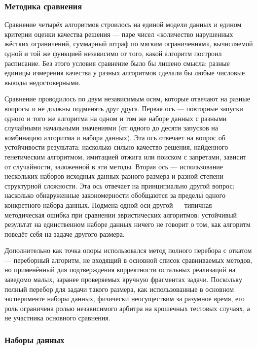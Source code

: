  
\subsubsection { Методика сравнения}

Сравнение четырёх алгоритмов строилось на единой модели данных и едином критерии оценки качества решения — паре чисел «количество нарушенных жёстких ограничений, суммарный штраф по мягким ограничениям», вычисляемой одной и той же функцией независимо от того, какой алгоритм построил расписание. Без этого условия сравнение было бы лишено смысла: разные единицы измерения качества у разных алгоритмов сделали бы любые числовые выводы недостоверными.

Сравнение проводилось по двум независимым осям, которые отвечают на разные вопросы и не должны подменять друг друга. Первая ось — повторные запуски одного и того же алгоритма на одном и том же наборе данных с разными случайными начальными значениями (от одного до десяти запусков на комбинацию алгоритма и набора данных). Эта ось отвечает на вопрос об устойчивости результата: насколько сильно качество решения, найденного генетическим алгоритмом, имитацией отжига или поиском с запретами, зависит от случайности, заложенной в эти методы. Вторая ось — использование нескольких наборов исходных данных разного размера и разной степени структурной сложности. Эта ось отвечает на принципиально другой вопрос: насколько обнаруженные закономерности обобщаются за пределы одного конкретного набора данных. Подмена одной оси другой — типичная методическая ошибка при сравнении эвристических алгоритмов: устойчивый результат на единственном наборе данных ничего не говорит о том, как алгоритм поведёт себя на задаче другого размера.

Дополнительно как точка опоры использовался метод полного перебора с откатом — переборный алгоритм, не входящий в основной список сравниваемых методов, но применённый для подтверждения корректности остальных реализаций на заведомо малых, заранее проверяемых вручную фрагментах задачи. Поскольку полный перебор для задачи такого размера, как использованные в основном эксперименте наборы данных, физически неосуществим за разумное время, его роль ограничена ролью независимого арбитра на крошечных тестовых случаях, а не участника основного сравнения.

\subsubsection { Наборы данных}

